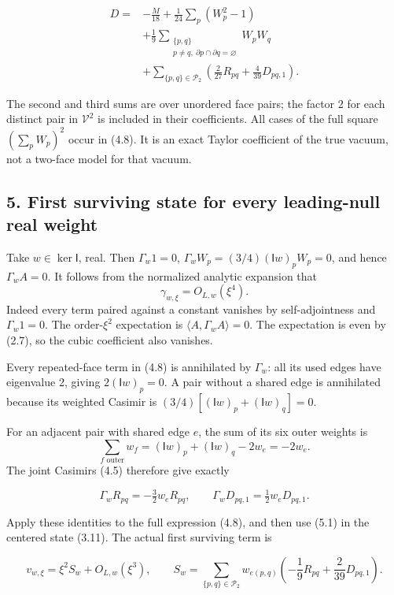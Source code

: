 \documentclass[
  11pt,
]{article}
\begin{document}
\[
\boxed{\begin{split}
D={}&-\frac M{18}+\frac1{24}\sum_p(W_p^2-1)\\
&+\frac19\sum_{\substack{\{p,q\}\\p\ne q,\ \partial p\cap\partial q=\varnothing}}W_pW_q\\
&+\sum_{\{p,q\}\in\mathscr P_2}
\left(\frac2{27}R_{pq}+\frac4{39}D_{pq,1}\right).
\end{split}}
\tag{4.8}
\]

The second and third sums are over unordered face pairs; the factor 2
for each distinct pair in \(\mathcal V^2\) is included in their
coefficients. All cases of the full square \((\sum_pW_p)^2\) occur in
(4.8). It is an exact Taylor coefficient of the true vacuum, not a
two-face model for that vacuum.

\subsection{5. First surviving state for every leading-null real
weight}\label{magnetic-part-4-first-surviving-state-for-every-leading-null-real-weight}

Take \(w\in\ker\mathsf I\), real. Then \(\Gamma_w1=0\),
\(\Gamma_wW_p=(3/4)(\mathsf Iw)_pW_p=0\), and hence \(\Gamma_wA=0\). It
follows from the normalized analytic expansion that \[
\gamma_{w,\xi}=O_{L,w}(\xi^4).
\tag{5.1}
\] Indeed every term paired against a constant vanishes by
self-adjointness and \(\Gamma_w1=0\). The order-\(\xi^2\) expectation is
\(\langle A,\Gamma_wA\rangle=0\). The expectation is even by (2.7), so
the cubic coefficient also vanishes.

Every repeated-face term in (4.8) is annihilated by \(\Gamma_w\): all
its used edges have eigenvalue 2, giving \(2(\mathsf Iw)_p=0\). A pair
without a shared edge is annihilated because its weighted Casimir is
\((3/4)[(\mathsf Iw)_p+(\mathsf Iw)_q]=0\).

For an adjacent pair with shared edge \(e\), the sum of its six outer
weights is \[
\sum_{f\text{ outer}}w_f=(\mathsf Iw)_p+(\mathsf Iw)_q-2w_e=-2w_e.
\] The joint Casimirs (4.5) therefore give exactly

\[
\Gamma_wR_{pq}=-\tfrac32w_eR_{pq},\qquad
\Gamma_wD_{pq,1}=\tfrac12w_eD_{pq,1}.
\tag{5.2}
\]

Apply these identities to the full expression (4.8), and then use (5.1)
in the centered state (3.11). The actual first surviving term is

\[
\boxed{
v_{w,\xi}=\xi^2S_w+O_{L,w}(\xi^3),\qquad
S_w=\sum_{\{p,q\}\in\mathscr P_2}
w_{e(p,q)}\left(-\frac19R_{pq}+\frac2{39}D_{pq,1}\right).}
\tag{5.3}
\]
\end{document}
